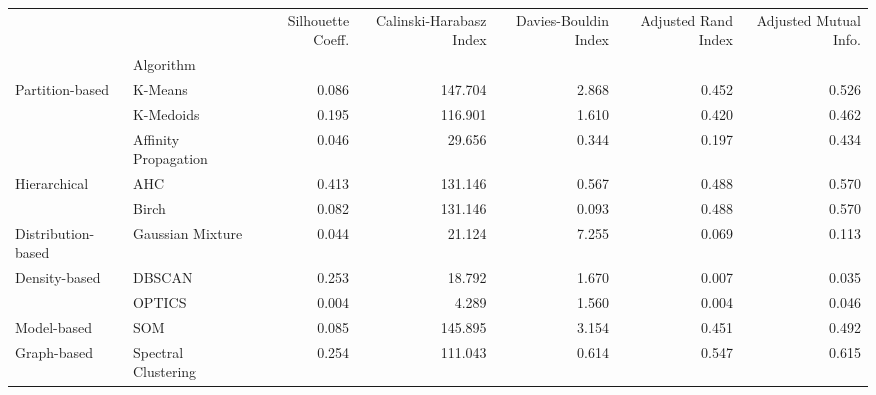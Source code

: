 \begin{tabular}{llrrrrr}
 &  & Silhouette Coeff. & Calinski-Harabasz Index & Davies-Bouldin Index & Adjusted Rand Index & Adjusted Mutual Info. \\
 & Algorithm &  &  &  &  &  \\
\multirow[c]{3}{*}{Partition-based} & K-Means & 0.086 & 147.704 & 2.868 & 0.452 & 0.526 \\
 & K-Medoids & 0.195 & 116.901 & 1.610 & 0.420 & 0.462 \\
 & Affinity Propagation & 0.046 & 29.656 & 0.344 & 0.197 & 0.434 \\
\multirow[c]{2}{*}{Hierarchical} & AHC & 0.413 & 131.146 & 0.567 & 0.488 & 0.570 \\
 & Birch & 0.082 & 131.146 & 0.093 & 0.488 & 0.570 \\
Distribution-based & Gaussian Mixture & 0.044 & 21.124 & 7.255 & 0.069 & 0.113 \\
\multirow[c]{2}{*}{Density-based} & DBSCAN & 0.253 & 18.792 & 1.670 & 0.007 & 0.035 \\
 & OPTICS & 0.004 & 4.289 & 1.560 & 0.004 & 0.046 \\
Model-based & SOM & 0.085 & 145.895 & 3.154 & 0.451 & 0.492 \\
Graph-based & Spectral Clustering & 0.254 & 111.043 & 0.614 & 0.547 & 0.615 \\
\end{tabular}

